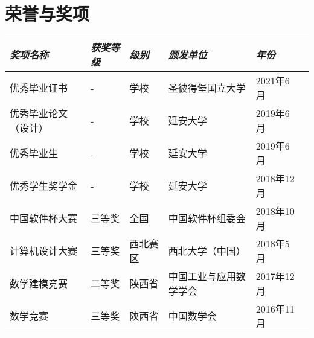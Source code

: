 \documentclass[UTF8,10pt]{ctexart}
\newcommand{\awardsTable}[1]{
	\begin{tabularx}{\textwidth}{llllll}
	\emph{奖项名称}	& \emph{获奖等级}	& \emph{级别}	& \emph{颁发单位} & \emph{年份}       \\
	\midrule\midrule
	#1
	\end{tabularx}
}
\newcommand{\awardsTableRow}[6]{
	\BeginAccSupp{method=plain, ActualText=11\string\t 21}#1 & #2 & #3 & #4 & #5\EndAccSupp{} \\
}
\begin{document}
\section{荣誉与奖项}
\setlength{\tabcolsep}{6.0pt}
\renewcommand{\arraystretch}{1.1}
\fontsize{8.5}{11}\selectfont
\awardsTable{
  \awardsTableRow{优秀毕业证书}{-}{学校}{圣彼得堡国立大学}{2021年6月} \\
  \awardsTableRow{优秀毕业论文（设计）}{-}{学校}{延安大学}{2019年6月} \\
  \awardsTableRow{优秀毕业生}{-}{学校}{延安大学}{2019年6月} \\
  \awardsTableRow{优秀学生奖学金}{-}{学校}{延安大学}{2018年12月} \\
  \awardsTableRow{中国软件杯大赛}{三等奖}{全国}{中国软件杯组委会}{2018年10月} \\
  \awardsTableRow{计算机设计大赛}{三等奖}{西北赛区}{西北大学（中国）}{2018年5月} \\
  \awardsTableRow{数学建模竞赛}{二等奖}{陕西省}{中国工业与应用数学学会}{2017年12月} \\
  \awardsTableRow{数学竞赛}{三等奖}{陕西省}{中国数学会}{2016年11月} \\ \hline }
\end{document}
